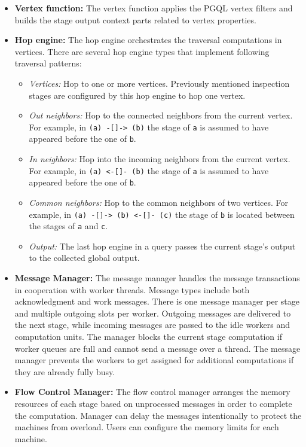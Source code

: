\begin{itemize}
  \item \textbf{Vertex function:}
  The vertex function applies the PGQL vertex filters and builds the stage output context parts related to vertex properties.
  \item \textbf{Hop engine:}
  The hop engine orchestrates the traversal computations in vertices.
  There are several hop engine types that implement following traversal patterns:
  \begin{itemize}
    \item \textit{Vertices:}
    Hop to one or more vertices.
    Previously mentioned inspection stages are configured by this hop engine to hop one vertex.
    \item \textit{Out neighbors:}
    Hop to the connected neighbors from the current vertex.
    For example, in \texttt{(a) -[]-> (b)} the stage of \texttt{a} is assumed to have appeared before the one of \texttt{b}.
    \item \textit{In neighbors:}
    Hop into the incoming neighbors from the current vertex.
    For example, in \texttt{(a) <-[]- (b)} the stage of \texttt{a} is assumed to have appeared before the one of \texttt{b}.
    \item \textit{Common neighbors:}
    Hop to the common neighbors of two vertices. 
    For example, in \texttt{(a) -[]-> (b) <-[]- (c)} the stage of \texttt{b} is located between the stages of \texttt{a} and \texttt{c}.
    \item \textit{Output:}
    The last hop engine in a query passes the current stage's output to the collected global output.
  \end{itemize}
  \item \textbf{Message Manager:}
  The message manager handles the message transactions in cooperation with worker threads.
  Message types include both acknowledgment and work messages.
  There is one message manager per stage and multiple outgoing slots per worker.
  Outgoing messages are delivered to the next stage, while incoming messages are passed to the idle workers and computation units.
  The manager blocks the current stage computation if worker queues are full and cannot send a message over a thread.
  The message manager prevents the workers to get assigned for additional computations if they are already fully busy.
  \item \textbf{Flow Control Manager:}
  The flow control manager arranges the memory resources of each stage based on unprocessed messages in order to complete the computation.
  Manager can delay the messages intentionally to protect the machines from overload.
  Users can configure the memory limits for each machine.
\end{itemize}
